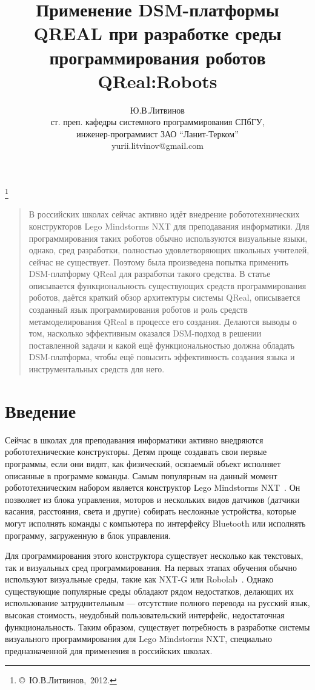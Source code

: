 \documentclass[a4paper]{article}
\title{Применение DSM-платформы QREAL при разработке среды программирования роботов QReal:Robots}
\author{Ю.В.Литвинов \\ ст. преп. кафедры системного программирования СПбГУ, \\ инженер-программист ЗАО ``Ланит-Терком'' \\ yurii.litvinov@gmail.com}
\date{}
\begin{document}
\maketitle
\thispagestyle{empty}

\renewcommand{\thefootnote}{}
\footnote{\small{\copyright~Ю.В.Литвинов,~2012.}}
\renewcommand{\thefootnote}{\arabic{footnote}}
\setcounter{footnote}{0}

\begin{quote}
\small\noindent
В российских школах сейчас активно идёт внедрение робототехнических конструкторов Lego Mindstorms NXT для преподавания информатики. Для программирования таких роботов обычно используются визуальные языки, однако, сред разработки, полностью удовлетворяющих школьных учителей, сейчас не существует. Поэтому была произведена попытка применить DSM-платформу QReal для разработки такого средства. В статье описывается функциональность существующих средств программирования роботов, даётся краткий обзор архитектуры системы QReal, описывается созданный язык программирования роботов и роль средств метамоделирования QReal в процессе его создания. Делаются выводы о том, насколько эффективным оказался DSM-подход в решении поставленной задачи и какой ещё функциональностью должна обладать DSM-платформа, чтобы ещё повысить эффективность создания языка и инструментальных средств для него.
\end{quote}

\section*{Введение}
Сейчас в школах для преподавания информатики активно внедряются робототехнические конструкторы. Детям проще создавать свои первые программы, если они видят, как физический, осязаемый объект исполняет описанные в программе команды. Самым популярным на данный момент робототехническим набором является конструктор Lego Mindstorms NXT~\cite{legoNxt}. Он позволяет из блока управления, моторов и нескольких видов датчиков (датчики касания, расстояния, света и другие) собирать несложные устройства, которые могут исполнять команды с компьютера по интерфейсу Bluetooth или исполнять программу, загруженную в блок управления.

Для программирования этого конструктора существует несколько как текстовых, так и визуальных сред программирования. На первых этапах обучения обычно используют визуальные среды, такие как NXT-G или Robolab~\cite{robolabHome}. Однако существующие популярные среды обладают рядом недостатков, делающих их использование затруднительным --- отсутствие полного перевода на русский язык, высокая стоимость, неудобный пользовательский интерфейс, недостаточная функциональность. Таким образом, существует потребность в разработке системы визуального программирования для Lego Mindstorms NXT, специально предназначенной для применения в российских школах.
\end{document}
